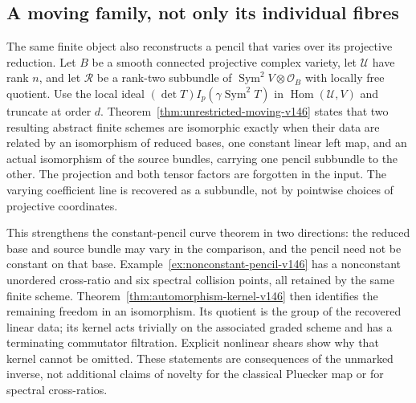 \documentclass[11pt,reqno]{amsart}
\numberwithin{equation}{section}
\theoremstyle{definition}\newtheorem{definition}[theorem]{Definition}
\theoremstyle{remark}\newtheorem{remark}[theorem]{Remark}
\newcommand{\OO}{\mathcal O}\newcommand{\II}{\mathcal I}
\DeclareMathOperator{\Sym}{Sym}\DeclareMathOperator{\Gr}{Gr}
\DeclareMathOperator{\Hom}{Hom}\DeclareMathOperator{\Tot}{Tot}
\begin{document}
\subsection{A moving family, not only its individual fibres}
The same finite object also reconstructs a pencil that varies over its
projective reduction.  Let \(B\) be a smooth connected projective
complex variety, let \(\mathcal U\) have rank \(n\), and let \(\mathcal R\) be a rank-two subbundle of
\(\Sym^2V\otimes\OO_B\) with locally free quotient.  Use the local
ideal \((\det T)I_p(\gamma\Sym^2T)\) in
\(\Hom(\mathcal U,V)\) and truncate at order \(d\).
Theorem~\ref{thm:unrestricted-moving-v146} states that two resulting
abstract finite schemes are isomorphic exactly when their data are
related by an isomorphism of reduced bases, one constant linear left
map, and an actual isomorphism of the source bundles, carrying one
pencil subbundle to the other.  The projection and both tensor factors
are forgotten in the input.  The varying coefficient line is recovered
as a subbundle, not by pointwise choices of projective coordinates.

This strengthens the constant-pencil curve theorem in two directions:
the reduced base and source bundle may vary in the comparison, and the
pencil need not be constant on that base.  Example~\ref{ex:nonconstant-pencil-v146}
has a nonconstant unordered cross-ratio and six spectral collision
points, all retained by the same finite scheme.  Theorem~\ref{thm:automorphism-kernel-v146}
then identifies the remaining freedom in an isomorphism.  Its quotient
is the group of the recovered linear data; its kernel acts trivially
on the associated graded scheme and has a terminating commutator
filtration.  Explicit nonlinear shears show why that kernel cannot be
omitted.  These statements are consequences of the unmarked inverse,
not additional claims of novelty for the classical Pluecker map or
for spectral cross-ratios.
\end{document}
